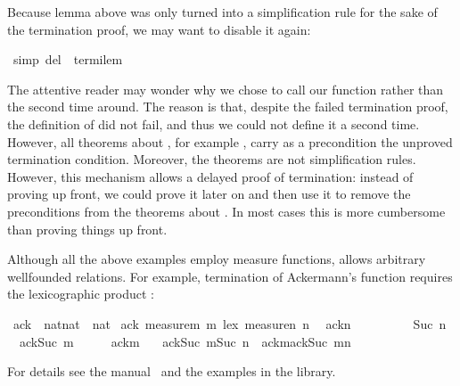 \begin{isabellebody}
\begin{isamarkuptext}
Because lemma  above was only turned into a
simplification rule for the sake of the termination proof, we may want to
disable it again:%
\end{isamarkuptext}%
\ {\isacharbrackleft}simp\ del{\isacharbrackright}\ {\isacharequal}\ termi{\isacharunderscore}lem%
\begin{isamarkuptext}%
The attentive reader may wonder why we chose to call our function 
rather than  the second time around. The reason is that, despite
the failed termination proof, the definition of  did not
fail, and thus we could not define it a second time. However, all theorems
about , for example , carry as a precondition
the unproved termination condition. Moreover, the theorems
 are not simplification rules. However, this mechanism
allows a delayed proof of termination: instead of proving
 up front, we could prove 
it later on and then use it to remove the preconditions from the theorems
about . In most cases this is more cumbersome than proving things
up front.

Although all the above examples employ measure functions, 
allows arbitrary wellfounded relations. For example, termination of
Ackermann's function requires the lexicographic product :%
\end{isamarkuptext}%
\ ack\ {\isacharcolon}{\isacharcolon}\ {\isachardoublequote}nat{\isacharasterisk}nat\ {\isasymRightarrow}\ nat{\isachardoublequote}\isanewline
{}\ ack\ {\isachardoublequote}measure{\isacharparenleft}{\isasymlambda}m{\isachardot}\ m{\isacharparenright}\ {\isacharless}{\isacharasterisk}lex{\isacharasterisk}{\isachargreater}\ measure{\isacharparenleft}{\isasymlambda}n{\isachardot}\ n{\isacharparenright}{\isachardoublequote}\isanewline
\ \ {\isachardoublequote}ack{\isacharparenleft}n{\isacharparenright}\ \ \ \ \ \ \ \ \ {\isacharequal}\ Suc\ n{\isachardoublequote}\isanewline
\ \ {\isachardoublequote}ack{\isacharparenleft}Suc\ m{\isacharcomma}\ \ \ \ \ {\isacharequal}\ ack{\isacharparenleft}m{\isacharcomma}\ \isanewline
\ \ {\isachardoublequote}ack{\isacharparenleft}Suc\ m{\isacharcomma}Suc\ n{\isacharparenright}\ {\isacharequal}\ ack{\isacharparenleft}m{\isacharcomma}ack{\isacharparenleft}Suc\ m{\isacharcomma}n{\isacharparenright}{\isacharparenright}{\isachardoublequote}%
\begin{isamarkuptext}%
\noindent
For details see the manual~\cite{isabelle-HOL} and the examples in the
library.%
\end{isamarkuptext}%
\end{isabellebody}%
